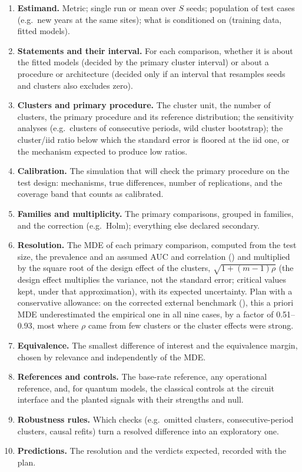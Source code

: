 \documentclass[11pt,a4paper]{article}
\begin{document}
\begin{enumerate}
\item \textbf{Estimand.} Metric; single run or mean over $S$ seeds; population of test cases (e.g.\ new years at the same sites); what is conditioned on (training data, fitted models).
\item \textbf{Statements and their interval.} For each comparison, whether it is about the fitted models (decided by the primary cluster interval) or about a procedure or architecture (decided only if an interval that resamples seeds and clusters also excludes zero).
\item \textbf{Clusters and primary procedure.} The cluster unit, the number of clusters, the primary procedure and its reference distribution; the sensitivity analyses (e.g.\ clusters of consecutive periods, wild cluster bootstrap); the cluster/iid ratio below which the standard error is floored at the iid one, or the mechanism expected to produce low ratios.
\item \textbf{Calibration.} The simulation that will check the primary procedure on the test design: mechanisms, true differences, number of replications, and the coverage band that counts as calibrated.
\item \textbf{Families and multiplicity.} The primary comparisons, grouped in families, and the correction (e.g.\ Holm); everything else declared secondary.
\item \textbf{Resolution.} The MDE of each primary comparison, computed from the test size, the prevalence and an assumed AUC and correlation () and multiplied by the square root of the design effect of the clusters, $\sqrt{1+(m-1)\rho}$ (the design effect multiplies the variance, not the standard error; critical values kept, under that approximation), with its expected uncertainty. Plan with a conservative allowance: on the corrected external benchmark (), this a priori MDE underestimated the empirical one in all nine cases, by a factor of 0.51--0.93, most where $\rho$ came from few clusters or the cluster effects were strong.
\item \textbf{Equivalence.} The smallest difference of interest and the equivalence margin, chosen by relevance and independently of the MDE.
\item \textbf{References and controls.} The base-rate reference, any operational reference, and, for quantum models, the classical controls at the circuit interface and the planted signals with their strengths and null.
\item \textbf{Robustness rules.} Which checks (e.g.\ omitted clusters, consecutive-period clusters, causal refits) turn a resolved difference into an exploratory one.
\item \textbf{Predictions.} The resolution and the verdicts expected, recorded with the plan.
\end{enumerate}
\end{document}
